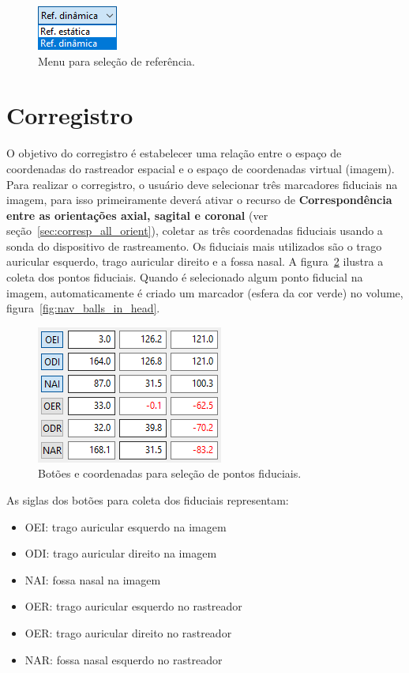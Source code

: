 \begin{figure}[!htb]
\centering
\includegraphics[scale=0.5]{../user_guide_figures/invesalius_screen/nav_menu_ref_pt.png}
\caption{Menu para seleção de referência.}
\label{fig:nav_menu_ref}
\end{figure}

\section{Corregistro}
\label{sec:corregistro}

O objetivo do corregistro é estabelecer uma relação entre o espaço de coordenadas do rastreador espacial e o espaço de coordenadas virtual (imagem). Para realizar o corregistro, o usuário deve selecionar três marcadores fiduciais na imagem, para isso primeiramente deverá ativar o recurso de \textbf{Correspondência entre as orientações axial, sagital e coronal} (ver seção~\ref{sec:corresp_all_orient}), coletar as três coordenadas fiduciais usando a sonda do dispositivo de rastreamento. Os fiduciais mais utilizados são o trago auricular esquerdo, trago auricular direito e a fossa nasal. A figura~\ref{fig:nav_selec_coord} ilustra a coleta dos pontos fiduciais. Quando é selecionado algum ponto fiducial na imagem, automaticamente é criado um marcador (esfera da cor verde) no volume, figura~\ref{fig:nav_balls_in_head}.

\begin{figure}[!htb]
\centering
\includegraphics[scale=0.5]{../user_guide_figures/invesalius_screen/nav_selec_coord_pt.png}
\caption{Botões e coordenadas para seleção de pontos fiduciais.}
\label{fig:nav_selec_coord}
\end{figure}

As siglas dos botões para coleta dos fiduciais representam:

\begin{itemize}
	\item OEI: trago auricular esquerdo na imagem
	\item ODI: trago auricular direito na imagem
	\item NAI: fossa nasal na imagem
	\item OER: trago auricular esquerdo no rastreador
	\item OER: trago auricular direito no rastreador
	\item NAR: fossa nasal esquerdo no rastreador
\end{itemize}

